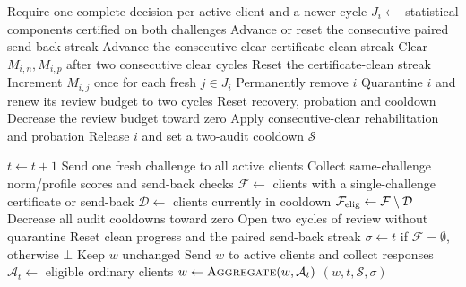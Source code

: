 \begin{algorithm}[!htb]
\caption{Phase III: confirm evidence and bound review}\label{alg:confirmation}
\begin{algorithmic}[1]\small
{}
 \State Require one complete decision per active client and a newer cycle
  \State $J_i\gets$ statistical components certified on both challenges
  \State Advance or reset the consecutive paired send-back streak
   \State Advance the consecutive-clear certificate-clean streak
   \State Clear $M_{i,n},M_{i,p}$ after two consecutive clear cycles
  \Else
   \State Reset the certificate-clean streak
   \State Increment $M_{i,j}$ once for each fresh $j\in J_i$\label{ln:confirm:increment}
  \EndIf
   \State Permanently remove $i$\label{ln:confirm:remove}
   \State Quarantine $i$ and renew its review budget to two cycles\label{ln:confirm:review}
   \State Reset recovery, probation and cooldown
  \Else
   \State Decrease the review budget toward zero
   \State Apply consecutive-clear rehabilitation and probation
    \State Release $i$ and set a two-audit cooldown\label{ln:confirm:release}
   \EndIf
  \EndIf
 \EndFor
 \State \Return $\mathcal S$
\EndProcedure
\end{algorithmic}
\end{algorithm}

\begin{algorithm}[!htb]
\caption{Phase IV: ordinary rounds and sparse audits}\label{alg:sparse}
\begin{algorithmic}[1]\small
{}
 \State $t\gets t+1$
  \State Send one fresh challenge to all active clients
  \State Collect same-challenge norm/profile scores and send-back checks\label{ln:sparse:measure}
  \State $\mathcal F\gets$ clients with a single-challenge certificate or send-back
  \State $\mathcal D\gets$ clients currently in cooldown
  \State $\mathcal F_{\rm elig}\gets\mathcal F\setminus\mathcal D$\label{ln:sparse:eligible}
  \State Decrease all audit cooldowns toward zero
   \State Open two cycles of review without quarantine\label{ln:sparse:enroll}
   \State Reset clean progress and the paired send-back streak
  \EndFor
  \State $\sigma\gets t$ if $\mathcal F=\emptyset$, otherwise $\bot$\label{ln:sparse:clock}
  \State Keep $w$ unchanged
 \Else
  \State Send $w$ to active clients and collect responses
  \State $\mathcal A_t\gets$ eligible ordinary clients
  \State $w\gets\Call{Aggregate}{w,\mathcal A_t}$
 \EndIf
 \State \Return $(w,t,\mathcal S,\sigma)$
\EndProcedure
\end{algorithmic}
\end{algorithm}
